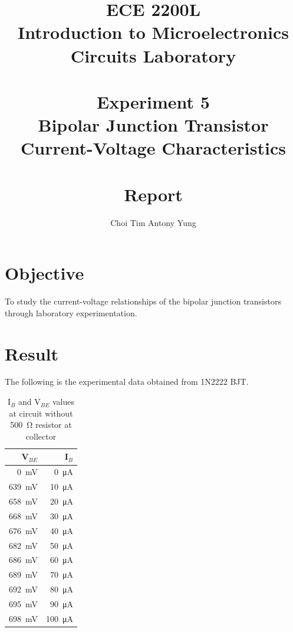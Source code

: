 \documentclass{article}
\title{ECE 2200L\\Introduction to Microelectronics Circuits Laboratory\\\,\\Experiment 5\\Bipolar Junction Transistor Current-Voltage Characteristics\\\,\\Report}
\author{Choi Tim Antony Yung}
\begin{document}
\maketitle

\thispagestyle{empty}
\setcounter{page}{0}

\newpage

\section*{Objective}

To study the current-voltage relationships of the bipolar junction transistors through laboratory experimentation.
\section*{Result}
The following is the experimental data obtained from 1N2222 BJT.
\begin{table}[H]
  \caption{I$_B$ and V$_{BE}$ values at circuit without \SI{500}{\ohm} resistor at collector}
  \centering
    \begin{tabular}{rr}
    \toprule
    \multicolumn{1}{r}{V$_{BE}$}& \multicolumn{1}{r}{I$_B$} \\
      \midrule
      \SI{0  }{\milli\volt} & \SI{  0}{\micro\ampere}  \\
      \SI{639}{\milli\volt} & \SI{ 10}{\micro\ampere}  \\
      \SI{658}{\milli\volt} & \SI{ 20}{\micro\ampere}  \\
      \SI{668}{\milli\volt} & \SI{ 30}{\micro\ampere}  \\
      \SI{676}{\milli\volt} & \SI{ 40}{\micro\ampere}  \\
      \SI{682}{\milli\volt} & \SI{ 50}{\micro\ampere}  \\
      \SI{686}{\milli\volt} & \SI{ 60}{\micro\ampere}  \\
      \SI{689}{\milli\volt} & \SI{ 70}{\micro\ampere}  \\
      \SI{692}{\milli\volt} & \SI{ 80}{\micro\ampere}  \\
      \SI{695}{\milli\volt} & \SI{ 90}{\micro\ampere}  \\
      \SI{698}{\milli\volt} & \SI{100}{\micro\ampere}  \\
    \bottomrule
  \end{tabular}
  \label{tab:IV1}%

\end{table}
\end{document}
